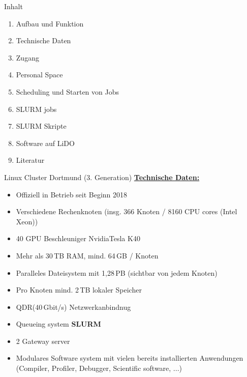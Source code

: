 

\makeatletter
    \newenvironment{withoutheadline}{
        \setbeamertemplate{headline}[default]
        \def\beamer@entrycode{\vspace*{-\headheight}}
    }{}
\makeatother


{
\maketitle
}

\begin{frame}[t]{Inhalt}
  \begin{enumerate}
    \item Aufbau und Funktion
    \item Technische Daten
    \item Zugang
    \item Personal Space
    \item Scheduling und Starten von Jobs
    \item SLURM jobs
    \item SLURM Skripte
    \item Software auf LiDO
    \item Literatur
  \end{enumerate}
\end{frame}

\begin{frame}{Linux Cluster Dortmund (3. Generation)}
  \underline{\textbf{Technische Daten:}}
  \begin{itemize}
    \item Offiziell in Betrieb seit Beginn 2018
    \item Verschiedene Rechenknoten (insg. 366 Knoten / 8160 CPU cores (Intel Xeon))
    \item 40 GPU Beschleuniger NvidiaTesla K40
    \item Mehr als 30\,TB RAM, mind. 64\,GB /  Knoten
    \item Paralleles Dateisystem mit 1,28\,PB (sichtbar von jedem Knoten)
    \item Pro Knoten mind. 2\,TB lokaler Speicher
    \item QDR(40\,Gbit/s) Netzwerkanbindnug
    \item Queueing system \textbf{SLURM}
    \item 2 Gateway server
    \item Modulares Software system mit vielen bereits installierten Anwendungen (Compiler, Profiler, Debugger, Scientific software, ...)
  \end{itemize}
\end{frame}

